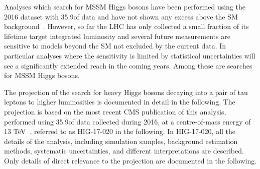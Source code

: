 %
Analyses which search for MSSM Higgs bosons have been performed using the 2016 dataset with 35.9\Uifb of data and have not shown any excess above the 
SM background~\cite{HIG-18-014,HIG-16-018,HIG-17-020}.
However, so far the LHC has only collected a small fraction of its lifetime target integrated luminosity and
several future measurements are sensitive to models beyond the SM not excluded by the current data. In particular 
analyses where the sensitivity is limited by statistical uncertainties will see a significantly extended reach in the 
coming years. Among these are searches for MSSM Higgs bosons.

The projection of the search for heavy Higgs bosons decaying into a pair of tau leptons to higher
luminosities is documented in detail in the following. The projection is based on the most recent CMS 
publication of this analysis, performed using 35.9\Uifb of data collected during 2016, at a centre-of-mass
energy of 13$~\text{TeV}$~\cite{HIG-17-020}, referred to as HIG-17-020 in the following. 
In HIG-17-020, all the details of the analysis, including simulation samples, background estimation methods,
systematic uncertainties, and different interpretations are described. 
Only details of direct relevance to the projection are documented in the following.

